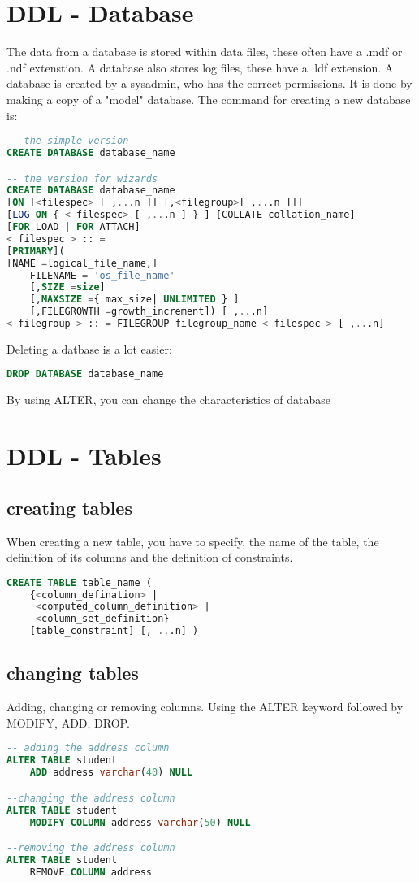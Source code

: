 \documentclass{report}
\begin{document}
 	\section{DDL - Database}
 	The data from a database is stored within data files, these often have a .mdf or .ndf extenstion. A database also stores log files, these have a .ldf extension.
 	A database is created by a sysadmin, who has the correct permissions. It is done by making a copy of a "model" database. 
 	The command for creating a new database is: 
 	\begin{lstlisting}[language=sql]
-- the simple version
CREATE DATABASE database_name

-- the version for wizards
CREATE DATABASE database_name 
[ON [<filespec> [ ,...n ]] [,<filegroup>[ ,...n ]]] 
[LOG ON { < filespec> [ ,...n ] } ] [COLLATE collation_name] 
[FOR LOAD | FOR ATTACH] 
< filespec > :: = 
[PRIMARY](
[NAME =logical_file_name,] 
	FILENAME = 'os_file_name' 
	[,SIZE =size] 
	[,MAXSIZE ={ max_size| UNLIMITED } ] 
	[,FILEGROWTH =growth_increment]) [ ,...n] 
< filegroup > :: = FILEGROUP filegroup_name < filespec > [ ,...n]\end{lstlisting}
	Deleting a datbase is a lot easier: 
	\begin{lstlisting}[language=sql]
DROP DATABASE database_name	\end{lstlisting}
	By using ALTER, you can change the characteristics of database
	\section{DDL - Tables}
	\subsection{creating tables}
	When creating a new table, you have to specify, the name of the table, the definition of its columns and the definition of constraints. 
	\begin{lstlisting}[language=sql]
CREATE TABLE table_name (
	{<column_defination> | 
	 <computed_column_definition> |
	 <column_set_definition}
	[table_constraint] [, ...n] )\end{lstlisting}
	\pagebreak
	\subsection{changing tables}
	Adding, changing or removing columns. Using the ALTER keyword followed by MODIFY, ADD, DROP. 
	\begin{lstlisting}[language=sql]
-- adding the address column
ALTER TABLE student
	ADD address varchar(40) NULL

--changing the address column
ALTER TABLE student
	MODIFY COLUMN address varchar(50) NULL

--removing the address column
ALTER TABLE student
	REMOVE COLUMN address\end{lstlisting}
\end{document}
